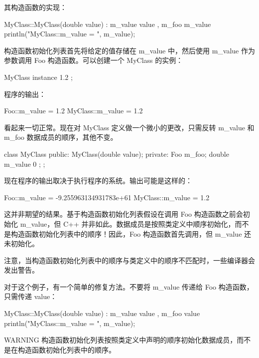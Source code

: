 其构造函数的实现：

\begin{cpp}
MyClass::MyClass(double value) : m_value { value }, m_foo { m_value }
{
    println("MyClass::m_value = {}", m_value);
}
\end{cpp}

构造函数初始化列表首先将给定的值存储在 m\_value 中，然后使用 m\_value 作为参数调用 Foo 构造函数。可以创建一个 MyClass 的实例：

\begin{cpp}
MyClass instance { 1.2 };
\end{cpp}

程序的输出：

\begin{cpp}
Foo::m_value = 1.2
MyClass::m_value = 1.2
\end{cpp}

看起来一切正常。现在对 MyClass 定义做一个微小的更改，只需反转 m\_value 和 m\_foo 数据成员的顺序，其他不变。

\begin{cpp}
class MyClass
{
    public:
        MyClass(double value);
    private:
        Foo m_foo;
        double m_value { 0 };
};
\end{cpp}

现在程序的输出取决于执行程序的系统。输出可能是这样的：

\begin{shell}
Foo::m_value = -9.255963134931783e+61
MyClass::m_value = 1.2
\end{shell}

这并非期望的结果。基于构造函数初始化列表假设在调用 Foo 构造函数之前会初始化 m\_value，但 C++ 并非如此。数据成员是按照类定义中顺序初始化，而不是构造函数初始化列表中的顺序！因此，Foo 构造函数首先调用，但 m\_value 还未初始化。

注意，当构造函数初始化列表中的顺序与类定义中的顺序不匹配时，一些编译器会发出警告。

对于这个例子，有一个简单的修复方法。不要将 m\_value 传递给 Foo 构造函数，只需传递 value：

\begin{cpp}
MyClass::MyClass(double value) : m_value { value }, m_foo { value }
{
    println("MyClass::m_value = {}", m_value);
}
\end{cpp}

\begin{myWarning}{WARNING}
构造函数初始化列表按照类定义中声明的顺序初始化数据成员，而不是在构造函数初始化列表中的顺序。
\end{myWarning}

